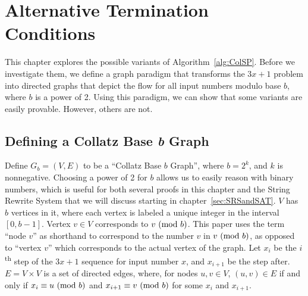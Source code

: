 \chapter{Alternative Termination Conditions} \label{sec:alttercdns}
 This chapter explores the possible variants of Algorithm~\ref{alg:ColSP}. Before we investigate them, we define a graph paradigm that transforms the $3x+1$ problem into directed graphs that depict the flow for all input numbers modulo base $b$, where $b$ is a power of 2. Using this paradigm, we can show that some variants are easily provable. However, others are not.
\section{Defining a Collatz Base \textit{b} Graph} \label{subsec:colgraph}
Define $G_b=(V,E)$ to be a ``Collatz Base $b$ Graph'', where $b = 2^k$, and $k$ is nonnegative. Choosing a power of 2 for $b$ allows us to easily reason with binary numbers, which is useful for both several proofs in this chapter and the String Rewrite System that we will discuss starting in chapter~\ref{sec:SRSandSAT}. $V$ has $b$ vertices in it, where each vertex is labeled a unique integer in the interval $[0, b-1]$. Vertex $v \in V$ corresponds to $v \ (\mathrm{mod}\ b)$. This paper uses the term ``node $v$'' as shorthand to correspond to the number $v$ in $v \ (\mathrm{mod}\ b)$, as opposed to ``vertex $v$'' which corresponds to the actual vertex of the graph. Let $x_i$ be the $i$\textsuperscript{th} step of the $3x+1$ sequence for input number $x$, and $x_{i+1}$ be the step after. $E = V \times V$ is a set of directed edges, where, for nodes $u, v \in V$, $(u,v) \in E$ if and only if $x_i \equiv u \ (\mathrm{mod}\ b)$ and $x_{i+1} \equiv v \ (\mathrm{mod}\ b)$ for some $x_i$ and $x_{i+1}$. \par

